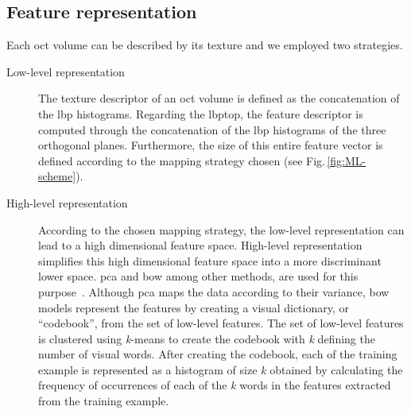 \subsection{Feature representation}\label{subsec:fearep}

Each \ac{oct} volume can be described by its texture and we employed two strategies.

\begin{description}

\item[Low-level representation] The texture descriptor of an \ac{oct} volume is defined as the concatenation of the \ac{lbp} histograms. Regarding the \ac{lbptop}, the feature descriptor is computed through the concatenation of the \ac{lbp} histograms of the three orthogonal planes. 
Furthermore, the size of this entire feature vector is defined according to the mapping strategy chosen (see Fig.\,\ref{fig:ML-scheme}).

\item[High-level representation] According to the chosen mapping strategy, the low-level representation can lead to a high dimensional feature space. 
High-level representation simplifies this high dimensional feature space into a more discriminant lower space. 
\Ac{pca} and \ac{bow} among other methods, are used for this purpose~\cite{Sivic2003}. 
Although \ac{pca} maps the data according to their variance, \ac{bow} models represent the features by creating a visual dictionary, or ``codebook'', from the set of low-level features.
The set of low-level features is clustered using \textit{k}-means to create the codebook with \textit{k} defining the number of visual words.
After creating the codebook, each of the training example is represented as a histogram of size \textit{k} obtained by calculating the frequency of occurrences of each of the \textit{k} words in the features extracted from the training example. 

\end{description}


